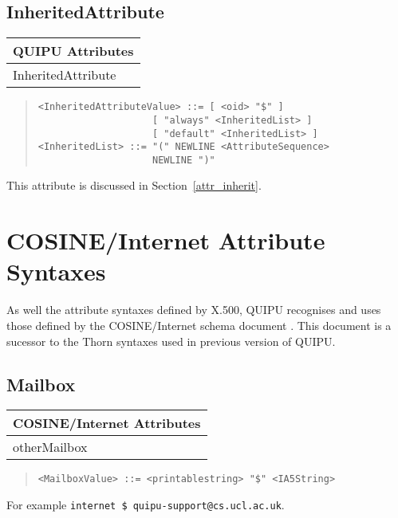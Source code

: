 \subsection{InheritedAttribute}
\begin{center}\small
\begin{tabular}{|l|}\hline
QUIPU Attributes \\ \hline
	InheritedAttribute\\
\hline
\end{tabular}
\end{center}
\begin{quote}\begin{verbatim}
<InheritedAttributeValue> ::= [ <oid> "$" ] 
                    [ "always" <InheritedList> ]
                    [ "default" <InheritedList> ]
<InheritedList> ::= "(" NEWLINE <AttributeSequence> 
                    NEWLINE ")"
\end{verbatim}\end{quote}
This attribute is discussed in Section~\ref{attr_inherit}.



\section{COSINE/Internet Attribute Syntaxes}

As well the attribute syntaxes defined by X.500, QUIPU recognises and
uses those defined by the COSINE/Internet schema document
\cite{Cosine.NA}.
This document is a sucessor to the Thorn syntaxes 
\cite{thorn-na} used in previous version of QUIPU.

\subsection{Mailbox}
\begin{center}\small
\begin{tabular}{|l|}\hline
COSINE/Internet Attributes \\ \hline
	otherMailbox\\
\hline
\end{tabular}
\end{center}
\begin{quote}\begin{verbatim}
<MailboxValue> ::= <printablestring> "$" <IA5String>
\end{verbatim}\end{quote}
For example \verb+internet $ quipu-support@cs.ucl.ac.uk+.


